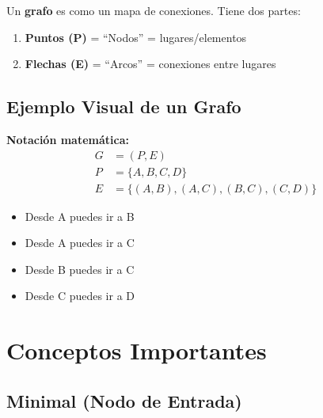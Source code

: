 \documentclass[12pt,a4paper]{article}
\begin{document}
Un \textbf{grafo} es como un mapa de conexiones. Tiene dos partes:

\begin{enumerate}
    \item \textbf{Puntos (P)} = ``Nodos'' = lugares/elementos
    \item \textbf{Flechas (E)} = ``Arcos'' = conexiones entre lugares
\end{enumerate}

\subsection{Ejemplo Visual de un Grafo}

\begin{center}
\end{center}

\textbf{Notación matemática:}
\begin{align*}
G &= (P, E) \\
P &= \{A, B, C, D\} \\
E &= \{(A,B), (A,C), (B,C), (C,D)\}
\end{align*}

\begin{itemize}
    \item Desde A puedes ir a B
    \item Desde A puedes ir a C
    \item Desde B puedes ir a C
    \item Desde C puedes ir a D
\end{itemize}

\section{Conceptos Importantes}

\subsection{Minimal (Nodo de Entrada)}
\end{document}
